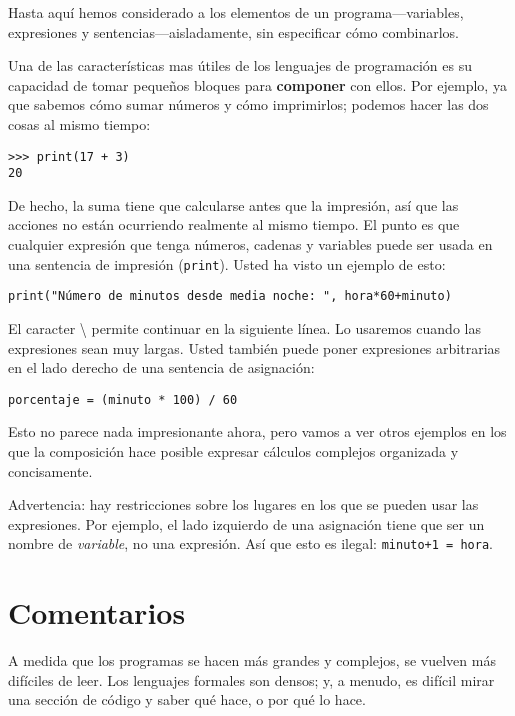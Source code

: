 
Hasta aquí hemos considerado a los elementos de un programa—variables,
expresiones y sentencias—aisladamente, sin especificar cómo combinarlos.

Una de las características mas útiles de los lenguajes de programación
es su capacidad de tomar pequeños bloques para \textbf{componer} con
ellos. Por ejemplo, ya que sabemos cómo sumar números y cómo imprimirlos;
podemos hacer las dos cosas al mismo tiempo:

\begin{lstlisting}
>>> print(17 + 3)
20
\end{lstlisting}
 De hecho, la suma tiene que calcularse antes que la impresión, así
que las acciones no están ocurriendo realmente al mismo tiempo. El
punto es que cualquier expresión que tenga números, cadenas y variables
puede ser usada en una sentencia de impresión (\texttt{print}). Usted
ha visto un ejemplo de esto:

\begin{lstlisting}
print("Número de minutos desde media noche: ", hora*60+minuto)
\end{lstlisting}
 El caracter \textbackslash{} permite continuar en la siguiente línea.
Lo usaremos cuando las expresiones sean muy largas. Usted también
puede poner expresiones arbitrarias en el lado derecho de una sentencia
de asignación:

\begin{lstlisting}
porcentaje = (minuto * 100) / 60
\end{lstlisting}
 Esto no parece nada impresionante ahora, pero vamos a ver otros ejemplos
en los que la composición hace posible expresar cálculos complejos
organizada y concisamente.

Advertencia: hay restricciones sobre los lugares en los que se pueden
usar las expresiones. Por ejemplo, el lado izquierdo de una asignación
tiene que ser un nombre de {\em variable}, no una expresión. Así
que esto es ilegal: \texttt{minuto+1 = hora}.

\section{Comentarios}


A medida que los programas se hacen más grandes y complejos, se vuelven
más difíciles de leer. Los lenguajes formales son densos; y, a menudo,
es difícil mirar una sección de código y saber qué hace, o por qué
lo hace.


